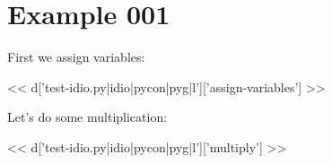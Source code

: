 \documentclass[11pt,a4paper]{article}
\begin{document}
\section{Example 001}

First we assign variables:

<< d['test-idio.py|idio|pycon|pyg|l']['assign-variables'] >>

Let's do some multiplication:

<< d['test-idio.py|idio|pycon|pyg|l']['multiply'] >>
\end{document}
